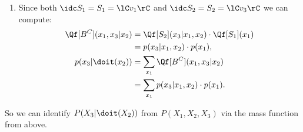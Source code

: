 \begin{Eg}
\begin{enumerate}
\begin{enumerate}
\begin{align*}
                    \end{align*}
                \item $A_{2,1} = \Anc^{[D_{2,0}]}(S_1) = \lC v_3  \rC = D_{2,0}$. thus $\idc S_2 = D_{2,0}$. Compute:
                 \begin{align*}
               \Qf[\idc S_2](x_3|x_1,x_2)  = \Qf[D_{2,0}](x_3|x_1,x_2)  = p(x_3|x_1,x_2).
                    \end{align*}
                \item $S_2 = \lC v_3 \rC =\idc S_2$. Compute:
                 \begin{align*}
               \Qf[S_2](x_3|x_1,x_2)  = \Qf[\idc S_2](x_3|x_1,x_2)  = p(x_3|x_1,x_2).
                    \end{align*}
            \end{enumerate}
        \item Since both $\idc S_1 = S_1 = \lC v_1 \rC$ and $\idc S_2 =S_2 = \lC v_3\rC$ we can compute:
               \begin{align*}
                   \Qf[B^C](x_1,x_3|x_2) &= \Qf[S_2](x_3|x_1,x_2) \cdot \Qf[S_1](x_1) \\ 
                                         &= p(x_3|x_1,x_2) \cdot p(x_1), \\
                   p(x_3|\doit(x_2)) & = \sum_{x_1} \Qf[B^C](x_1,x_3|x_2) \\ 
                   & = \sum_{x_1} p(x_3|x_1,x_2) \cdot p(x_1). 
               \end{align*}
    \end{enumerate}
    So we can identify $P(X_3|\doit(X_2))$ from $P(X_1,X_2,X_3)$ via the mass function from above.
\end{Eg}

